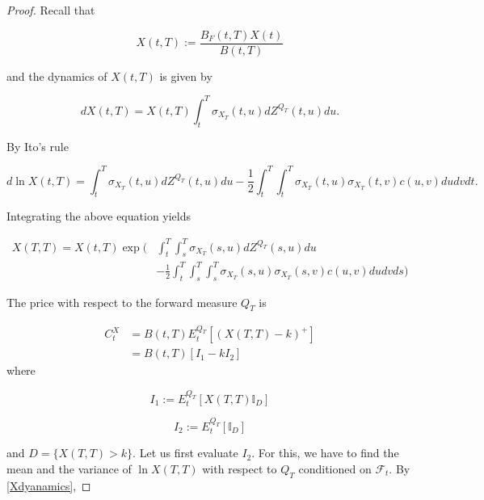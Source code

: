 \documentclass[11pt]{article}
\newcommand{\filt}{\ensuremath{\mathcal{F}}}
\begin{document}
\begin{proof}

Recall that 

\begin{equation*}
    X(t,T):=\frac{B_F(t,T) X(t)}{B(t,T)}
\end{equation*}

and the dynamics of $X(t,T)$ is given by 

\begin{equation}
    dX(t,T)=X(t,T)\int_t^{T}\sigma_{X_T}(t,u)dZ^{Q_{T}}(t,u)du. 
\end{equation}



By Ito's rule

\begin{equation*}
    d\ln X(t,T)= \int_t^T \sigma_{X_T}(t,u)dZ^{Q_T} (t,u) du-\frac{1}{2}\int_t^T \int_t^T \sigma_{X_T}(t,u)\sigma_{X_T}(t,v)c(u,v)dudvdt. 
\end{equation*}

Integrating the above equation yields

\begin{equation}\label{Xdyanamics}
\begin{split}
 X(T,T)=X(t,T)\exp\Bigg( &\int_t^T\int_s^T \sigma_{X_T}(s,u)dZ^{Q_T}(s,u)du\\
 &-\frac{1}{2}\int_t^T \int_s^T\int_s^T \sigma_{X_T}(s,u)\sigma_{X_T}(s,v)c(u,v)dudvds\Bigg)
\end{split}
\end{equation}

 The price with respect to the forward measure $Q_T$ is 

\begin{equation*}
\begin{split}
        C_t^X&=B(t,T)E_t^{Q_T}\left[(X(T,T)-k)^+\right]\\
        &= B(t,T)[I_1-kI_2]
\end{split}
\end{equation*}
where 

\begin{equation*}
    I_1:=E_t^{Q_T}[X(T,T)\mathbb{I}_D]
\end{equation*}

\begin{equation*}
    I_2:=E_t^{Q_T}[\mathbb{I}_D]
\end{equation*}

and $D=\{X(T,T)>k\}.$ Let us first evaluate $I_2$. For this, we have to find the mean and the variance of $\ln X(T,T)$ with respect to $Q_T$ conditioned on $\filt_t.$ By \eqref{Xdyanamics}, 


\end{proof}
\end{document}
